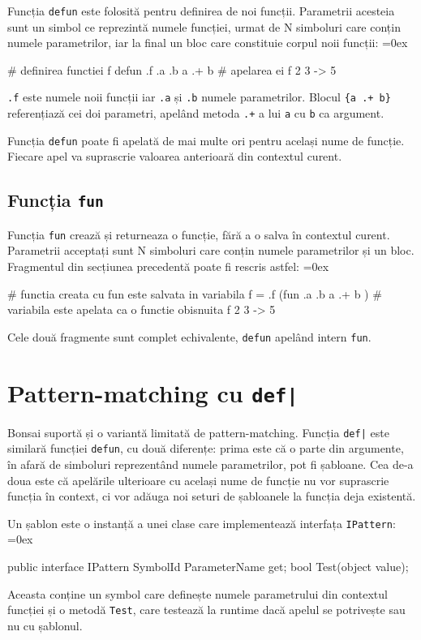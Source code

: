\documentclass[12pt,a4paper]{memoir}
\renewcommand{\c}{\texttt}
\newenvironment{code}
{
\definecolor{shadecolor}{gray}{0.91}
\topsep=0ex
\relax
\shaded
\verbatim
}
{
\endverbatim
\endshaded
}
\begin{document}
Funcția \c{defun} este folosită pentru definirea de noi funcții. Parametrii acesteia sunt un simbol ce reprezintă numele funcției, urmat de N simboluri care conțin numele parametrilor, iar la final un bloc care constituie corpul noii funcții:
\begin{code}
# definirea functiei f
defun .f .a .b {
  a .+ b 
}
# apelarea ei
f 2 3
  -> 5
\end{code}
\c{.f} este numele noii funcții iar \c{.a} și \c{.b} numele parametrilor. Blocul \c{\{a .+ b\}} referențiază cei doi parametri, apelând metoda \c{.+} a lui \c{a} cu \c{b} ca argument.

Funcția \c{defun} poate fi apelată de mai multe ori pentru același nume de funcție. Fiecare apel va suprascrie valoarea anterioară din contextul curent.

\subsection{Funcția \c{fun}}

Funcția \c{fun} crează și returneaza o funcție, fără a o salva în contextul curent. Parametrii acceptați sunt N simboluri care conțin numele parametrilor și un bloc. Fragmentul din secțiunea precedentă poate fi rescris astfel:
\begin{code}
# functia creata cu fun este salvata in variabila f
= .f (fun .a .b { a .+ b })
# variabila este apelata ca o functie obisnuita
f 2 3
  -> 5
\end{code}

Cele două fragmente sunt complet echivalente, \c{defun} apelând intern \c{fun}.

\section{Pattern-matching cu \c{def|}}

Bonsai suportă și o variantă limitată de pattern-matching. Funcția \c{def|} este similară funcției \c{defun}, cu două diferențe:
prima este că o parte din argumente, în afară de simboluri reprezentând numele parametrilor, pot fi șabloane. Cea de-a doua este că apelările ulterioare cu același nume de funcție nu vor suprascrie funcția în context, ci vor adăuga noi seturi de șabloanele la funcția deja existentă.

Un șablon este o instanță a unei clase care implementează interfața \c{IPattern}:
\begin{code}
public interface IPattern {
  SymbolId ParameterName { get; }
  bool Test(object value);
}
\end{code}
Aceasta conține un symbol care definește numele parametrului din contextul funcției și o metodă \c{Test}, care testează la runtime dacă apelul se potrivește sau nu cu șablonul.
\end{document}
